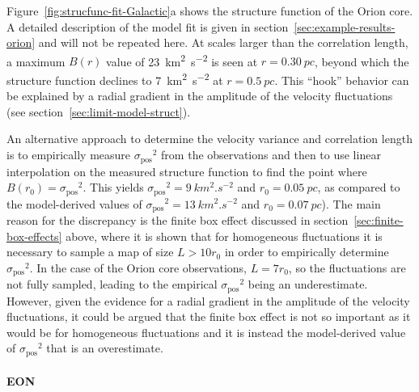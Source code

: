 \documentclass[fleqn,usenatbib, useAMS, a4paper]{mnras}
\newcommand\pos{\ensuremath{_{\mathrm{pos}}}}
\begin{document}
Figure~\ref{fig:strucfunc-fit-Galactic}a shows the structure function of the Orion core.
A detailed description of the model fit is given in section~\ref{sec:example-results-orion} and will not be repeated here.
At scales larger than the correlation length,
a maximum \(B(r)\) value of \SI{23}{km^{2}.s^{-2}} is seen at \(r = \SI{0.30}{pc}\),
beyond which the structure function declines to \SI{7}{km^{2}.s^{-2}} at \(r =  \SI{0.5}{pc}\). 
This ``hook'' behavior can be explained by a radial gradient in the
amplitude of the velocity fluctuations (see section~\ref{sec:limit-model-struct}).

An alternative approach to determine the velocity variance and correlation length
is to empirically measure \(\sigma\pos^2\) from the observations and then to use linear
interpolation on the measured structure function to find the point where \(B(r_0) = \sigma\pos^2\).
This yields \(\sigma\pos^2 = \SI{9}{km^{2}.s^{-2}}\) and \(r_0 = \SI{0.05}{pc} \),
as compared to the model-derived values of \(\sigma\pos^2 = \SI{13}{km^{2}.s^{-2}}\) and \(r_0 = \SI{0.07}{pc} \)).
The main reason for the discrepancy is the finite box effect
discussed in section~\ref{sec:finite-box-effects} above, where it is shown
that for homogeneous fluctuations it is necessary to sample a map of size \(L > 10 r_0\)
in order to empirically determine \(\sigma\pos^2\).
In the case of the Orion core observations, \(L = 7 r_0\),
so the fluctuations are not fully sampled, leading
to the empirical \(\sigma\pos^2\) being an underestimate.
However, given the evidence for a radial gradient in the amplitude of the velocity fluctuations,
it could be argued that the finite box effect is not so important as it would be for homogeneous fluctuations
and it is instead the model-derived value of \(\sigma\pos^2\) that is an overestimate.


\paragraph*{EON}
\end{document}
